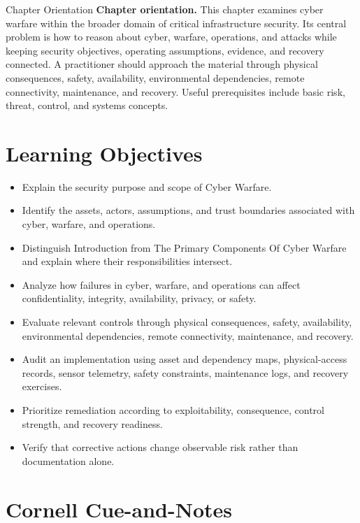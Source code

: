 \documentclass[11pt,letterpaper]{article}
\title{\CornellDocumentTitle}
\author{}
\date{}
\begin{document}
\maketitle
\begin{CornellOverviewBox}{Chapter Orientation}
\textbf{Chapter orientation.} This chapter examines cyber warfare within the broader domain of critical infrastructure security. Its central problem is how to reason about cyber, warfare, operations, and attacks while keeping security objectives, operating assumptions, evidence, and recovery connected. A practitioner should approach the material through physical consequences, safety, availability, environmental dependencies, remote connectivity, maintenance, and recovery. Useful prerequisites include basic risk, threat, control, and systems concepts.
\end{CornellOverviewBox}
\section*{Learning Objectives}
\begin{itemize}
\item Explain the security purpose and scope of Cyber Warfare.
\item Identify the assets, actors, assumptions, and trust boundaries associated with cyber, warfare, and operations.
\item Distinguish Introduction from The Primary Components Of Cyber Warfare and explain where their responsibilities intersect.
\item Analyze how failures in cyber, warfare, and operations can affect confidentiality, integrity, availability, privacy, or safety.
\item Evaluate relevant controls through physical consequences, safety, availability, environmental dependencies, remote connectivity, maintenance, and recovery.
\item Audit an implementation using asset and dependency maps, physical-access records, sensor telemetry, safety constraints, maintenance logs, and recovery exercises.
\item Prioritize remediation according to exploitability, consequence, control strength, and recovery readiness.
\item Verify that corrective actions change observable risk rather than documentation alone.
\end{itemize}
\section*{Cornell Cue-and-Notes}
\end{document}
